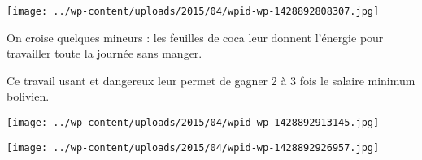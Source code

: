 

\begin{center} \texttt{[image: ../wp-content/uploads/2015/04/wpid-wp-1428892808307.jpg]} \end{center}



 On croise quelques mineurs : les feuilles de coca leur donnent l'énergie pour travailler toute la journée sans manger. 

 Ce travail usant et dangereux leur permet de gagner 2 à 3 fois le salaire minimum bolivien. 

 

\begin{center} \texttt{[image: ../wp-content/uploads/2015/04/wpid-wp-1428892913145.jpg]} \end{center}



 

\begin{center} \texttt{[image: ../wp-content/uploads/2015/04/wpid-wp-1428892926957.jpg]} \end{center}




 
 
